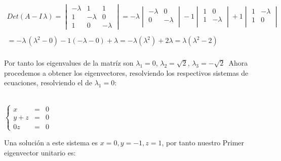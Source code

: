 \documentclass[11pt,letterpaper]{article}
\begin{document}
    \begin{align*}
        Det(A-I\,\lambda)=
            \begin{vmatrix}
                -\lambda & 1 & 1\\
                1 & -\lambda & 0\\
                1 & 0 & -\lambda
            \end{vmatrix}=-\lambda
            \begin{vmatrix}
                -\lambda & 0 \\
                0 & -\lambda \\
                \end{vmatrix}
                -1  
                \begin{vmatrix}
                1 & 0 \\
                1 & -\lambda \\
                \end{vmatrix}
                +1
                  \begin{vmatrix}
                1 & -\lambda \\
                1 & 0\\
                \end{vmatrix}\,\\
                \,\\
                =-\lambda\,(\lambda^2-0)-1(-\lambda-0)+\lambda
                =-\lambda(\lambda^2)+2\lambda=\lambda(\lambda^2-2)
    \end{align*}\,\\
    Por tanto los eigenvalues de la matr\'iz son $\lambda_1=0$, $\lambda_2=\sqrt{2}$, $\lambda_3=-\sqrt{2}$\,
    Ahora procedemos a obtener los eigenvectores, resolviendo los respectivos sistemas de ecuaciones, resolviendo
    el de $\lambda_1=0$:\,\\
    \,\\
    \begin{center}
     $\left\{ 
         \begin{array}{rcl}
            x&=&0\\
            y+z&=&0\\
            0z&=&0
         \end{array}
       \right.$\,\\
        \end{center}
    Una soluci\'on a este sistema es $x=0,y=-1,z=1$, por tanto nuestro Primer
    eigenvector unitario es:\,\\
    \,\\
\end{document}
